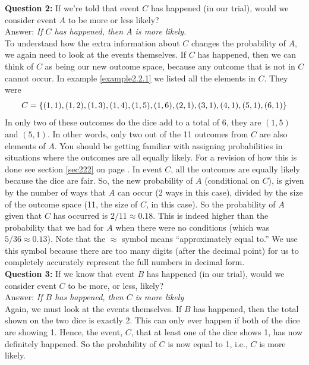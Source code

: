 \noindent \textbf{Question 2:} If we're told that event $C$ has happened (in our trial), would we consider event $A$ to be more or less likely? \\
Answer: \textit{If $C$ has happened, then $A$ is more likely.} \\
To understand how the extra information about $C$ changes the probability of $A$, we again need to look at the events themselves. If $C$ has happened, then we can think of $C$ as being our new outcome space, because any outcome that is not in $C$ cannot occur. In example \ref{example2.2.1} we listed all the elements in $C$. They were
\[
C = \left\{(1,1),(1,2),(1,3),(1,4),(1,5),(1,6),(2,1),(3,1),(4,1),(5,1),(6,1)\right\}
\]
In only two of these outcomes do the dice add to a total of 6, they are $(1,5)$ and $(5,1).$ In other words, only two out of the 11 outcomes from $C$ are also elements of $A$. You should be getting familiar with assigning probabilities in situations where the outcomes are all equally likely. For a revision of how this is done see section \ref{sec222} on page \pageref{sec222}. In event $C$, all the outcomes are equally likely because the dice are fair. So, the new probability of $A$ (conditional on $C$), is given by the number of ways that $A$ can occur (2 ways in this case), divided by the size of the outcome space (11, the size of $C$, in this case). So the probability of $A$ given that $C$ has occurred is $2/11 \approx 0.18.$ This is indeed higher than the probability that we had for $A$ when there were no conditions (which was $5/36 \approx 0.13$). Note that the $\approx$ symbol means ``approximately equal to.'' We use this symbol because there are too many digits (after the decimal point) for us to completely accurately represent the full numbers in decimal form. \label{symbapprox} \\

\noindent \textbf{Question 3:} If we know that event $B$ has happened (in our trial), would we consider event $C$ to be more, or less, likely? \\
Answer: \textit{If $B$ has happened, then $C$ is more likely} \\
Again, we must look at the events themselves. If $B$ has happened, then the total shown on the two dice is exactly 2. This can only ever happen if both of the dice are showing 1. Hence, the event, $C$, that at least one of the dice shows 1, has now definitely happened. So the probability of $C$ is now equal to 1, i.e., $C$ is more likely.

